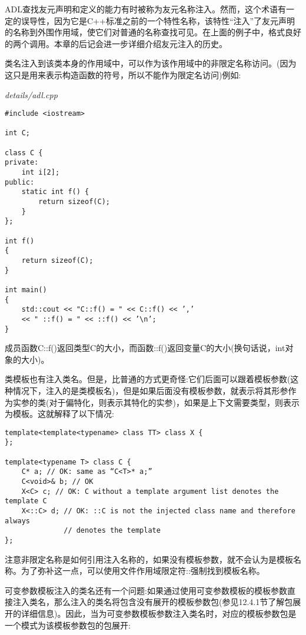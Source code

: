 ADL查找友元声明和定义的能力有时被称为友元名称注入。然而，这个术语有一定的误导性，因为它是C++标准之前的一个特性名称，该特性“注入”了友元声明的名称到外围作用域，使它们对普通的名称查找可见。在上面的例子中，格式良好的两个调用。本章的后记会进一步详细介绍友元注入的历史。


类名注入到该类本身的作用域中，可以作为该作用域中的非限定名称访问。(因为这只是用来表示构造函数的符号，所以不能作为限定名访问)例如:

\noindent
\textit{details/adl.cpp}
\begin{lstlisting}[style=styleCXX]
#include <iostream>

int C;

class C {
private:
	int i[2];
public:
	static int f() {
		return sizeof(C);
	}
};

int f()
{
	return sizeof(C);
}

int main()
{
	std::cout << "C::f() = " << C::f() << ’,’
	<< " ::f() = " << ::f() << ’\n’;
}
\end{lstlisting}

成员函数C::f()返回类型C的大小，而函数::f()返回变量C的大小(换句话说，int对象的大小)。

类模板也有注入类名。但是，比普通的方式更奇怪:它们后面可以跟着模板参数(这种情况下，注入的是类模板名)，但是如果后面没有模板参数，就表示将其形参作为实参的类(对于偏特化，则表示其特化的实参)，如果是上下文需要类型，则表示为模板。这就解释了以下情况:

\begin{lstlisting}[style=styleCXX]
template<template<typename> class TT> class X {
};

template<typename T> class C {
	C* a; // OK: same as “C<T>* a;”
	C<void>& b; // OK
	X<C> c; // OK: C without a template argument list denotes the template C
	X<::C> d; // OK: ::C is not the injected class name and therefore always
			  // denotes the template
};
\end{lstlisting}

注意非限定名称是如何引用注入名称的，如果没有模板参数，就不会认为是模板名称。为了弥补这一点，可以使用文件作用域限定符::强制找到模板名称。

可变参数模板注入的类名还有一个问题:如果通过使用可变参数模板的模板参数直接注入类名，那么注入的类名将包含没有展开的模板参数包(参见12.4.1节了解包展开的详细信息)。因此，当为可变参数模板参数注入类名时，对应的模板参数包是一个模式为该模板参数包的包展开:

